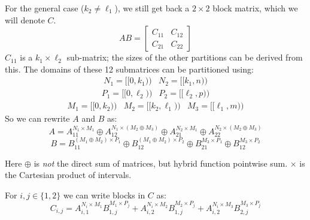 For the general case ($k_2 \neq \ell_1$), we still get back a $2 \times 2$ block matrix, which we will denote $C$.
\begin{equation}
	AB = \left[ \begin{array}{cc} C_{11} & C_{12} \\ C_{21} & C_{22} \end{array} \right]
\end{equation}
$C_{11}$ is a $k_1 \times \ell_2$ sub-matrix; the sizes of the other partitions can be derived from this.
The domains of these 12 submatrices can be partitioned using:
\begin{equation*}\begin{array}{cc}
	N_1 = [\![0,k_1)\!) & N_2 = [\![k_1, n)\!) 
\end{array}\end{equation*}
\begin{equation*}\begin{array}{cc}
	P_1 = [\![0, \ell_2)\!) & P_2 = [\![ \ell_2, p)\!)
\end{array}\end{equation*}
\begin{equation*}\begin{array}{ccc}
	M_1 = [\![0,k_2)\!) & M_2 = [\![ k_2, \ell_1)\!) & M_3 = [\![ \ell_1, m)\!)
\end{array}\end{equation*}
So we can rewrite $A$ and $B$ as:
\begin{equation}
	A = 	A_{11}^{N_1 \times M_1} \oplus A_{12}^{N_1 \times (M_2 \oplus M_3)} \oplus 
			A_{21}^{N_2 \times M_1} \oplus A_{22}^{N_2 \times (M_2 \oplus M_3)}
\end{equation}
\begin{equation}
	B = 		B_{11}^{(M_1 \oplus M_2) \times P_1} \oplus B_{12}^{(M_1 \oplus M_2) \times P_2} \oplus 
			B_{21}^{M_3 \times P_1} \oplus B_{12}^{M_3 \times P_2}
\end{equation}

Here $\oplus$ is \emph{not} the direct sum of matrices, but hybrid function pointwise sum. 
$\times$ is the Cartesian product of intervals. 

For $i,j \in \{ 1,2 \}$ we can write blocks in $C$ as:
\begin{equation}
	C_{i,j} 	= A_{i,1}^{N_i \times M_1} B_{1,j}^{M_1 \times P_j} 
			+ A_{i,2}^{N_i \times M_2} B_{1,j}^{M_2 \times P_j}
			+ A_{i,2}^{N_i \times M_3} B_{2,j}^{M_3 \times P_j}
\end{equation}

